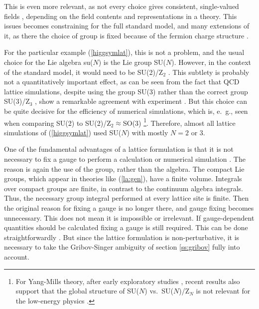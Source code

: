 \documentclass[final,12pt]{article}
\newcommand*{\pref}[1]{(\ref{#1})}
\newcommand*{\1}{1\!\!\!\bot}
\begin{document}
This is even more relevant, as not every choice gives consistent, single-valued fields \cite{O'Raifeartaigh:1986vq}, depending on the field contents and representations in a theory. This issues becomes constraining for the full standard model, and many extensions of it, as there the choice of group is fixed because of the fermion charge structure \cite{O'Raifeartaigh:1986vq}.

For the particular example \pref{higgsymlat}, this is not a problem, and the usual choice for the Lie algebra su($N$) is the Lie group SU($N$). However, in the context of the standard model, it would need to be SU(2)/Z$_2$ \cite{O'Raifeartaigh:1986vq}. This subtlety is probably not a quantitatively important effect, as can be seen from the fact that QCD lattice simulations, despite using the group SU(3) rather than the correct group SU(3)/Z$_3$ \cite{O'Raifeartaigh:1986vq}, show a remarkable agreement with experiment \cite{Gattringer:2010zz,DeGrand:2006zz}. But this choice can be quite decisive for the efficiency of numerical simulations, which is, e.\ g., seen when comparing SU(2) to SU(2)/Z$_2\approx$SO(3) \cite{deForcrand:2002vs,Friedberg:1995cq,Burgio:2006xj,Burgio:2006dc}\footnote{For Yang-Mills theory, after early exploratory studies \cite{Greensite:1981hw,Halliday:1981te,Creutz:1982ga,Drouffe:1982fe}, recent results also support that the global structure of SU($N$) vs.\ SU($N$)/Z$_N$ is not relevant for the low-energy physics \cite{deForcrand:2002vx,Teper:2018aa}.}. Therefore, almost all lattice simulations of \pref{higgsymlat} used SU($N$) with mostly $N=2$ or $3$.

One of the fundamental advantages of a lattice formulation is that it is not necessary to fix a gauge to perform a calculation or numerical simulation \cite{Montvay:1994cy,Gattringer:2010zz,DeGrand:2006zz}. The reason is again the use of the group, rather than the algebra. The compact Lie groups, which appear in theories like \pref{la:gen}, have a finite volume. Integrals over compact groups are finite, in contrast to the continuum algebra integrals. Thus, the necessary group integral performed at every lattice site is finite. Then the original reason for fixing a gauge is no longer there, and gauge fixing becomes unnecessary. This does not mean it is impossible or irrelevant. If gauge-dependent quantities should be calculated fixing a gauge is still required. This can be done straightforwardly \cite{Maas:2011se}. But since the lattice formulation is non-perturbative, it is necessary to take the Gribov-Singer ambiguity of section \ref{ss:gribov} fully into account.
\end{document}
